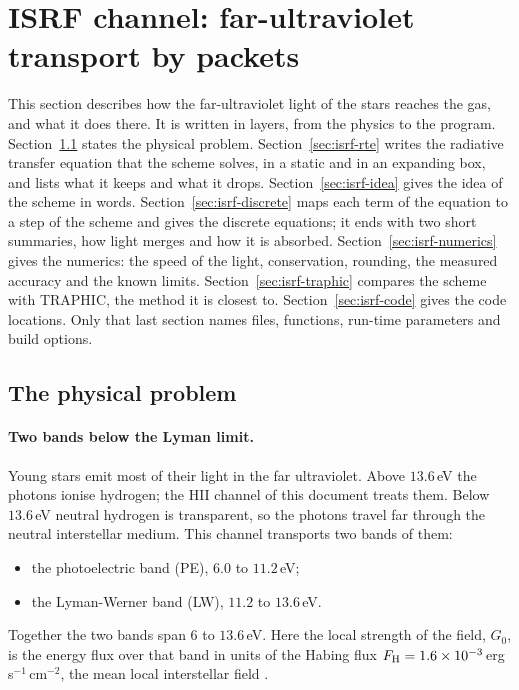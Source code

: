 \section{ISRF channel: far-ultraviolet transport by packets}
\label{sec:packet}

This section describes how the far-ultraviolet light of the stars reaches the
gas, and what it does there. It is written in layers, from the physics to the
program. Section~\ref{sec:isrf-problem} states the physical problem.
Section~\ref{sec:isrf-rte} writes the radiative transfer equation that the
scheme solves, in a static and in an expanding box, and lists what it keeps
and what it drops. Section~\ref{sec:isrf-idea} gives the idea of the scheme
in words. Section~\ref{sec:isrf-discrete} maps each term of the equation to a
step of the scheme and gives the discrete equations; it ends with two short
summaries, how light merges and how it is absorbed.
Section~\ref{sec:isrf-numerics} gives the numerics: the speed of the light,
conservation, rounding, the measured accuracy and the known limits.
Section~\ref{sec:isrf-traphic} compares the scheme with TRAPHIC, the method it
is closest to. Section~\ref{sec:isrf-code} gives the code locations. Only that
last section names files, functions, run-time parameters and build options.

\subsection{The physical problem}
\label{sec:isrf-problem}

\paragraph{Two bands below the Lyman limit.} Young stars emit most of their
light in the far ultraviolet. Above $13.6$\,eV the photons ionise hydrogen;
the HII channel of this document treats them. Below $13.6$\,eV neutral
hydrogen is transparent, so the photons travel far through the neutral
interstellar medium. This channel transports two bands of them:
\begin{itemize}
  \item the photoelectric band (PE), $6.0$ to $11.2$\,eV;
  \item the Lyman-Werner band (LW), $11.2$ to $13.6$\,eV.
\end{itemize}
Together the two bands span $6$ to $13.6$\,eV. Here the local strength of the
field, $G_0$, is the energy flux over that band in units of the Habing flux
$F_{\rm H}=1.6\times10^{-3}$\,erg\,s$^{-1}$\,cm$^{-2}$, the mean local
interstellar field \citep{Habing1968}.

